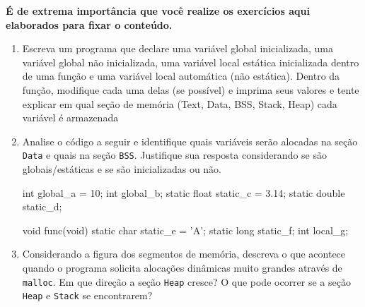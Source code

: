 \textbf{É de extrema importância que você realize os exercícios aqui elaborados para fixar o conteúdo.}

\begin{enumerate}
    \item {Escreva um programa que declare uma variável global inicializada, uma 
        variável global não inicializada, uma variável local estática inicializada 
        dentro de uma função e uma variável local automática (não estática). 
        Dentro da função, modifique cada uma delas (se possível) e imprima seus 
        valores e tente explicar em qual seção de memória (Text, Data, BSS, Stack, Heap) 
        cada variável é armazenada}
    \item {Analise o código a seguir e identifique quais variáveis serão alocadas na seção \texttt{Data} e quais na seção \texttt{BSS}. Justifique sua resposta considerando se são globais/estáticas e se são inicializadas ou não.}
\newpage
    \begin{excode}
        int global_a = 10;
        int global_b;
        static float static_c = 3.14;
        static double static_d;
        
        void func(void) {
            static char static_e = 'A';
            static long static_f;
            int local_g;
        }
    \end{excode}
    \item {Considerando a figura dos segmentos de memória, descreva o que 
        acontece quando o programa solicita alocações dinâmicas muito grandes 
        através de \texttt{malloc}. Em que direção a seção \texttt{Heap} cresce? O que 
        pode ocorrer se a seção \texttt{Heap} e \texttt{Stack} se encontrarem?}
\end{enumerate}
